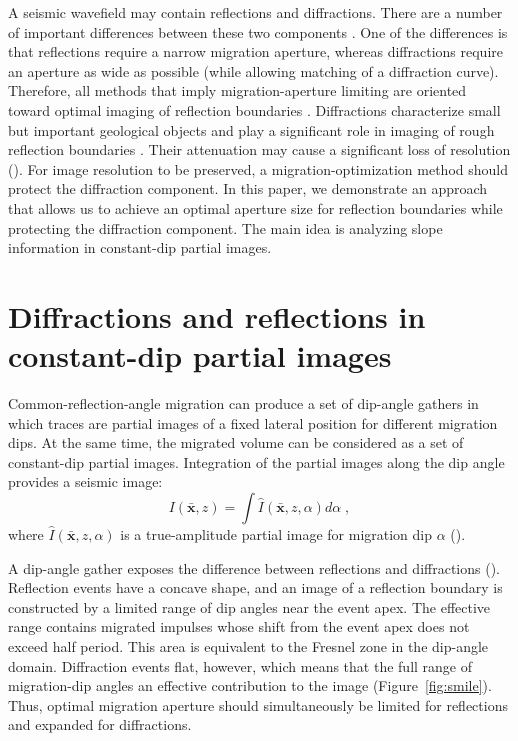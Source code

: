 A seismic wavefield may contain reflections and diffractions. There are a number of important 
differences between these two components \cite[]{klem-musatov94}.
One of the differences is that reflections require a narrow migration aperture, whereas diffractions require an aperture as
wide as possible (while allowing matching of a diffraction curve).
Therefore, all methods that imply migration-aperture limiting are oriented
toward optimal imaging of reflection boundaries . Diffractions characterize small but important geological
objects and play a significant role in imaging of rough reflection boundaries \cite[]{khaidukov04}.
Their attenuation may cause a significant loss of resolution (\citealp[]{neidell97}). For image resolution to be preserved,
a migration-optimization method should  protect the diffraction component. In this paper, we demonstrate an approach
that allows us to achieve an optimal aperture size for reflection boundaries while  protecting the diffraction component.
The main idea is analyzing slope information in constant-dip partial images.

\section{Diffractions and reflections in constant-dip partial images}

Common-reflection-angle migration \cite[]{xu01} can produce a set of 
dip-angle gathers in which traces are partial images of a fixed lateral position for different migration dips.
At the same time, the migrated volume can be considered as a set of constant-dip partial images. Integration of the 
partial images along the dip angle provides a seismic image:
\begin{equation}
\label{eq:imaging}
I(\mathbf{\bar{x}},z)=\int\limits\hat{I}(\mathbf{\bar{x}},z,\alpha)d\alpha\;,
\end{equation}
where $\hat{I}(\mathbf{\bar{x}},z,\alpha)$ is a true-amplitude partial image for migration dip $\alpha$ (\citealp[]{bleistein2002}).

A dip-angle gather exposes the difference between reflections and diffractions (\citealp[]{audebert02,landa08,klokov12}). 
Reflection events have a concave shape, and an image of a reflection boundary is constructed by a limited range of dip
angles near the event apex. The effective range contains migrated impulses whose shift from the event apex does not 
exceed half  period. This area is equivalent to the Fresnel zone in the dip-angle domain.
Diffraction events  flat, however, which means that the full range of migration-dip angles 
an effective contribution to the image (Figure~\ref{fig:smile}). Thus,  optimal migration aperture should simultaneously be limited for reflections
and expanded for diffractions.

